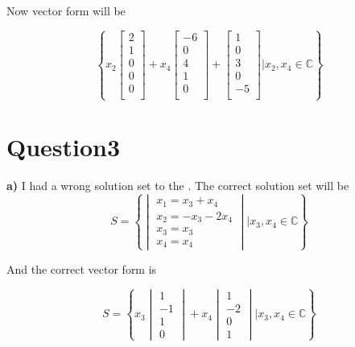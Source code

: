 \documentclass{article}
\begin{document}
Now vector form will be

\begin{equation}
  \left\{
    x_2
    \begin{bmatrix}
      2 \\
      1 \\
      0 \\
      0 \\
      0 \\
    \end{bmatrix}
    +
    x_4
    \begin{bmatrix}
      -6 \\
      0 \\
      4 \\
      1 \\
      0 \\
    \end{bmatrix}
    +
    \begin{bmatrix}
      1 \\
      0 \\
      3 \\
      0 \\
      -5 \\
    \end{bmatrix}
    |
    x_2, x_4\in\mathbb{C}
  \right\}
\end{equation}

\section{Question3}
\noindent\textbf{a)} I had a wrong solution set to the \nullspace. The correct solution set will be
\[
S=
\left\{
  \begin{vmatrix}
    x_1 = x_3 + x_4 \\
    x_2 = -x_3 - 2x_4 \\
    x_3 = x_3 \\
    x_4 = x_4
  \end{vmatrix}
  |
  x_3, x_4\in\mathbb{C}
\right\}
\]

And the correct vector form is

\[
S=
\left\{
  x_3
  \begin{vmatrix}
    1 \\
    -1 \\
    1 \\
    0
  \end{vmatrix}
  +
  x_4
  \begin{vmatrix}
    1 \\
    -2 \\
    0 \\
    1
  \end{vmatrix}
  |
  x_3, x_4\in\mathbb{C}
\right\}
\]
\end{document}
